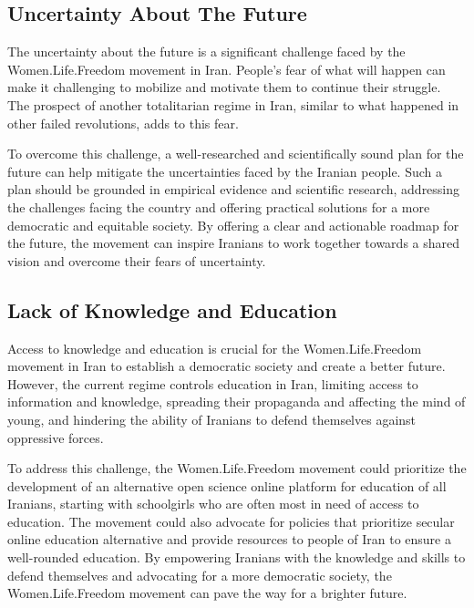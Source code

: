 \documentclass{IEEEtran}
\begin{document}
\subsection{Uncertainty About The Future}
The uncertainty about the future is a significant challenge faced by the Women.Life.Freedom movement in Iran. 
People's fear of what will happen can make it challenging to mobilize and motivate them to continue their struggle.
The prospect of another totalitarian regime in Iran, similar to what happened in other failed revolutions, adds to this fear.


To overcome this challenge, a well-researched and scientifically sound plan for the future can help mitigate the uncertainties faced by the Iranian people. Such a plan should be grounded in empirical evidence and scientific research, addressing the challenges facing the country and offering practical solutions for a more democratic and equitable society. By offering a clear and actionable roadmap for the future, the movement can inspire Iranians to work together towards a shared vision and overcome their fears of uncertainty.

\subsection{Lack of Knowledge and Education}

Access to knowledge and education is crucial for the Women.Life.Freedom movement in Iran to establish a democratic society and create a better future. However, the current regime controls education in Iran, limiting access to information and knowledge, spreading their propaganda and affecting the mind of young, and hindering the ability of Iranians to defend themselves against oppressive forces.

To address this challenge, the Women.Life.Freedom movement could prioritize the development of an alternative open science online platform for education of all Iranians, starting with schoolgirls who are often most in need of access to education. The movement could also advocate for policies that prioritize secular online education alternative and provide resources to people of Iran to ensure a well-rounded education.
By empowering Iranians with the knowledge and skills to defend themselves and advocating for a more democratic society, the Women.Life.Freedom movement can pave the way for a brighter future.
\end{document}
